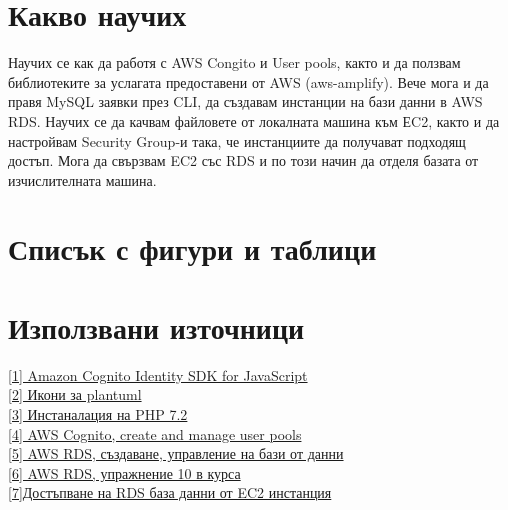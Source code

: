 \documentclass[12pt]{article}
\begin{document}
\section{Какво научих}
Научих се как да работя с AWS Congito и User pools, както и да ползвам библиотеките за услагата предоставени от AWS (aws-amplify). Вече мога и да правя MySQL заявки през CLI, да създавам инстанции на бази данни в AWS RDS. Научих се да качвам файловете от локалната машина към ЕC2, както и да настройвам Security Group-и така, че инстанциите да получават подходящ достъп. Мога да свързвам EC2 със RDS и по този начин да отделя базата от изчислителната машина. 


\newpage 

\section{Списък с фигури и таблици}

\listoftables

\listoffigures

\section{Използвани източници}

\noindent\href{https://github.com/aws-amplify/amplify-js/tree/master/packages/amazon-cognito-identity-js}{[1] Amazon Cognito Identity SDK for JavaScript}
\\\href{https://github.com/awslabs/aws-icons-for-plantuml}{[2] Икони за plantuml}
\\\noindent\href{https://aws.amazon.com/premiumsupport/knowledge-center/ec2-install-extras-library-software/}{[3] Инстаналация на PHP 7.2}
\\\noindent\href{https://docs.aws.amazon.com/cognito/latest/developerguide/what-is-amazon-cognito.html} {[4] AWS Cognito, create and manage user pools}
\\\noindent\href{https://docs.aws.amazon.com/AmazonRDS/latest/UserGuide/CHAP_GettingStarted.CreatingConnecting.MySQL.html}
{[5] AWS RDS, създаване, управление на бази от данни}
\\\noindent\href{https://learn.fmi.uni-sofia.bg/pluginfile.php/247022/mod_resource/content/0/Exercise\%2012\%20-\%20RDS\%20-\%20Exercise.pdSf }
{[6] AWS RDS, упражнение 10 в курса}
\\\noindent\href{https://docs.aws.amazon.com/AmazonRDS/latest/UserGuide/USER_VPC.Scenarios.html}{[7]Достъпване на RDS база данни от EC2 инстанция}

 
\medskip



\bigskip
\end{document}
